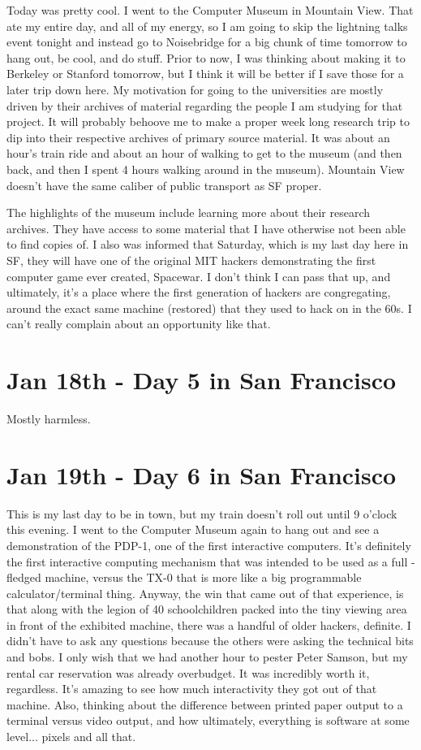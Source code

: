\documentclass[11pt]{amsart}
\begin{document}
Today was pretty cool. I went to the Computer Museum in Mountain View. That ate my entire day, and all of my energy, so I am going to skip the lightning talks event tonight and instead go to Noisebridge for a big chunk of time tomorrow to hang out, be cool, and do stuff. Prior to now, I was thinking about making it to Berkeley or Stanford tomorrow, but I think it will be better if I save those for a later trip down here. My motivation for going to the universities are mostly driven by their archives of material regarding the people I am studying for that project. It will probably behoove me to make a proper week long research trip to dip into their respective archives of primary source material. It was about an hour's train ride and about an hour of walking to get to the museum (and then back, and then I spent 4 hours walking around in the museum). Mountain View doesn't have the same caliber of public transport as SF proper.

The highlights of the museum include learning more about their research archives. They have access to some material that I have otherwise not been able to find copies of.  I also was informed that Saturday, which is my last day here in SF, they will have one of the original MIT hackers demonstrating the first computer game ever created, Spacewar. I don't think I can pass that up, and ultimately, it's a place where the first generation of hackers are congregating, around the exact same machine (restored) that they used to hack on in the 60s. I can't really complain about an opportunity like that.

\section{Jan 18th - Day 5 in San Francisco}

Mostly harmless.

\section{Jan 19th - Day 6 in San Francisco}

This is my last day to be in town, but my train doesn't roll out until 9 o'clock this evening. I went to the Computer Museum again to hang out and see a demonstration of the PDP-1, one of the first interactive computers. It's definitely the first interactive computing mechanism that was intended to be used as a full - fledged machine, versus the TX-0 that is more like a big programmable calculator/terminal thing. Anyway, the win that came out of that experience, is that along with the legion of 40 schoolchildren packed into the tiny viewing area in front of the exhibited machine, there was a handful of older hackers, definite. I didn't have to ask any questions because the others were asking the technical bits and bobs. I only wish that we had another hour to pester Peter Samson, but my rental car reservation was already overbudget. It was incredibly worth it, regardless. It's amazing to see how much interactivity they got out of that machine. Also, thinking about the difference between printed paper output to a terminal versus video output, and how ultimately, everything is software at some level...  pixels and all that.
\end{document}
